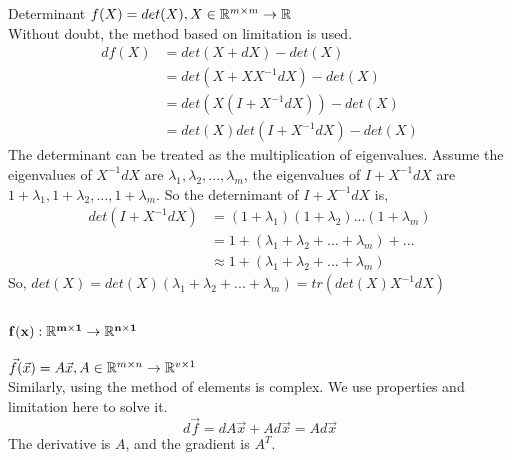 			\begin{Examples}{Determinant}{}
				$f(X)=det(X),X\in\mathbb{R}^{m\times m}\rightarrow \mathbb{R}$\\
				Without doubt, the method based on limitation is used.
				\begin{equation*}
				\begin{split}
					df(X) &= det(X+dX)-det(X) \\
					&=det(X+XX^{-1}dX)-det(X) \\
					&=det(X(I+X^{-1}dX))-det(X) \\
					&=det(X)det(I+X^{-1}dX) -det(X)
				\end{split}
				\end{equation*}
				The determinant can be treated as the multiplication of eigenvalues. Assume the eigenvalues of $X^{-1}dX$ are $\lambda_1,\lambda_2,...,\lambda_m$, the eigenvalues of $I+X^{-1}dX$ are $1+\lambda_1,1+\lambda_2,...,1+\lambda_m$. So the deternimant of $I+X^{-1}dX$ is,
				\begin{equation*}
					\begin{split}
						det(I+X^{-1}dX)&=(1+\lambda_1)(1+\lambda_2)...(1+\lambda_m) \\
						&=1+(\lambda_1+\lambda_2+...+\lambda_m)+...\\
						&\approx 1+(\lambda_1+\lambda_2+...+\lambda_m)
					\end{split}
				\end{equation*}
				So, $det(X)=det(X)(\lambda_1+\lambda_2+...+\lambda_m)=tr(det(X)X^{-1}dX)$
			\end{Examples}
		
		\subsubsection{$\mathbf{f(x):\mathbb{R}^{m\times 1}\rightarrow\mathbb{R}^{n\times1}}$}
			\begin{Examples}{}{}
				$\vec f(\vec x)=A\vec x,A\in\mathbb{R}^{m\times n}\rightarrow \mathbb{R}^{v\times1}$\\
				Similarly, using the method of elements is complex. We use properties and limitation here to solve it.
				$$
				d\vec f=dA\vec x+Ad\vec x=Ad\vec x
				$$
				The derivative is $A$, and the gradient is $A^T$.
			\end{Examples}
		
